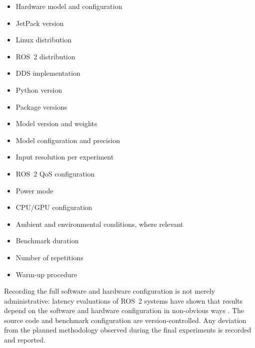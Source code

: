 \begin{itemize}
  \item Hardware model and configuration
  \item JetPack version
  \item Linux distribution
  \item ROS~2 distribution
  \item DDS implementation
  \item Python version
  \item Package versions
  \item Model version and weights
  \item Model configuration and precision
  \item Input resolution per experiment
  \item ROS~2 QoS configuration
  \item Power mode
  \item CPU/GPU configuration
  \item Ambient and environmental conditions, where relevant
  \item Benchmark duration
  \item Number of repetitions
  \item Warm-up procedure
\end{itemize}

Recording the full software and hardware configuration is not merely
administrative: latency evaluations of ROS~2 systems have shown that
results depend on the software and hardware configuration in non-obvious
ways \cite{betz2023a, kronauer2021}. The source code and benchmark
configuration are version-controlled. Any deviation from the planned
methodology observed during the final experiments is recorded and
reported.
